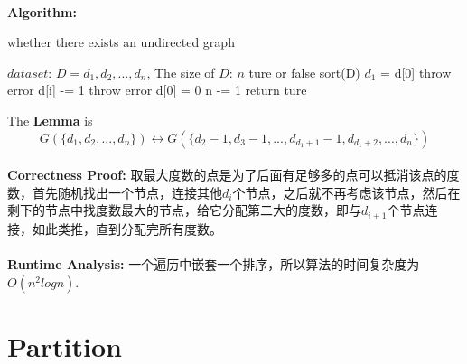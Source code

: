 \documentclass[11pt]{article}
\begin{document}
\begin{CJK*}{GBK}{song}
    \paragraph{}\textbf{Algorithm:}\\
    \begin{algorithm}
        \caption{whether there exists an undirected graph}
        \begin{algorithmic}[1]
            \Require $dataset$: $D = d_1, d_2,...,d_n$, \qquad The size of $D$: $n$
            \Ensure ture or false
                    \State sort(D)
                    \State $d_1$ = d[0]
                        \State throw error
                    \Else
                            d[i] -= 1
                                \State throw error
                            \EndIf
                        \EndFor
                        \State d[0] = 0
                        \State n -= 1
                    \EndIf
                \EndWhile
                \State return ture
            \EndFunction
        \end{algorithmic}
    \end{algorithm}



The \textbf{Lemma} is
    \begin{equation*}
    G(\{d_1, d_2,...,d_n\}) \leftrightarrow G(\{d_2 - 1, d_3 - 1,...,d_{d_1+1} - 1, d_{d_1+2},...,d_n\})
    \end{equation*}

\paragraph{}\textbf{Correctness Proof:}
取最大度数的点是为了后面有足够多的点可以抵消该点的度数，首先随机找出一个节点，连接其他$d_i$个节点，之后就不再考虑该节点，然后在剩下的节点中找度数最大的节点，给它分配第二大的度数，即与$d_{i+1}$个节点连接，如此类推，直到分配完所有度数。


\paragraph{}\textbf{Runtime Analysis:} 一个遍历中嵌套一个排序，所以算法的时间复杂度为$O(n^2 logn)$.

\section{Partition}


\end{CJK*}
\end{document}
